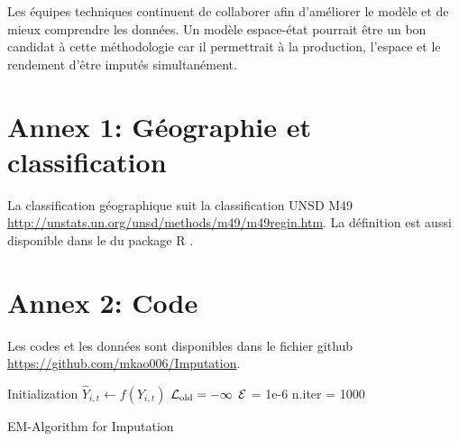 \documentclass[nojss]{jss}\usepackage{graphicx, color}
\begin{document}
Les \'{e}quipes techniques continuent de collaborer afin
d'am\'{e}liorer le mod\`{e}le et de mieux comprendre les
donn\'{e}es. Un mod\`{e}le espace-\'{e}tat pourrait \^{e}tre un bon
candidat \`{a} cette m\'{e}thodologie car il permettrait \`{a} la
production, l'espace et le rendement d'être imput\'{e}s
simultan\'{e}ment.



\section*{Annex 1: G\'{e}ographie et classification}

La classification g\'{e}ographique suit la classification UNSD M49
\url{http://unstats.un.org/unsd/methods/m49/m49regin.htm}. La
d\'{e}finition est aussi disponible dans le  du
package R .


\section*{Annex 2: Code}


Les codes et les donn\'{e}es sont disponibles dans le fichier github 
\url{https://github.com/mkao006/Imputation}.

\begin{algorithm}
  \SetAlgoLined
  \BlankLine
  Initialization\;
  \Indp\Indp\Indp 
  $\hat{Y}_{i, t} \leftarrow f(Y_{i, t})$\;
  $\cal{L}_{\text{old}} = -\infty$\;
  $\cal{E}$ = 1e-6\;
  n.iter = 1000\;
  \Indm\Indm\Indm 
  
    \caption{EM-Algorithm for Imputation}
    \label{alg:imputation}
\end{algorithm}
  
      
\end{document}

